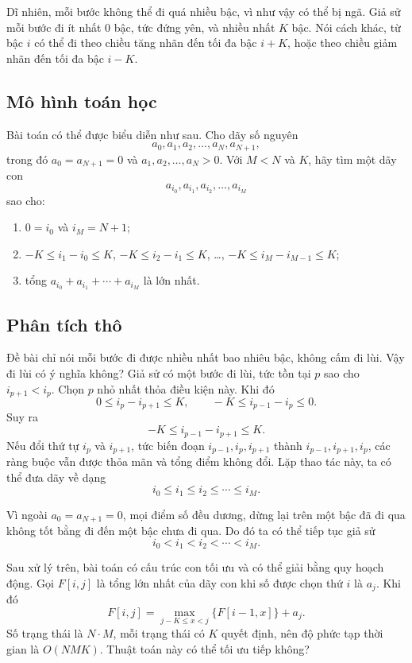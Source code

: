\documentclass[11pt]{article}
\begin{document}
Dĩ nhiên, mỗi bước không thể đi quá nhiều bậc, vì như vậy có thể bị ngã. Giả
sử mỗi bước đi ít nhất $0$ bậc, tức đứng yên, và nhiều nhất $K$ bậc. Nói cách
khác, từ bậc $i$ có thể đi theo chiều tăng nhãn đến tối đa bậc $i+K$, hoặc
theo chiều giảm nhãn đến tối đa bậc $i-K$.

\subsection{Mô hình toán học}

Bài toán có thể được biểu diễn như sau. Cho dãy số nguyên
\[
  a_0,a_1,a_2,\ldots,a_N,a_{N+1},
\]
trong đó $a_0=a_{N+1}=0$ và $a_1,a_2,\ldots,a_N>0$. Với $M<N$ và $K$, hãy tìm
một dãy con
\[
  a_{i_0},a_{i_1},a_{i_2},\ldots,a_{i_M}
\]
sao cho:
\begin{enumerate}
  \item $0=i_0$ và $i_M=N+1$;
  \item $-K\le i_1-i_0\le K$, $-K\le i_2-i_1\le K$, \ldots,
  $-K\le i_M-i_{M-1}\le K$;
  \item tổng $a_{i_0}+a_{i_1}+\cdots+a_{i_M}$ là lớn nhất.
\end{enumerate}

\subsection{Phân tích thô}

Đề bài chỉ nói mỗi bước đi được nhiều nhất bao nhiêu bậc, không cấm đi lùi.
Vậy đi lùi có ý nghĩa không? Giả sử có một bước đi lùi, tức tồn tại $p$ sao
cho $i_{p+1}<i_p$. Chọn $p$ nhỏ nhất thỏa điều kiện này. Khi đó
\[
  0\le i_p-i_{p+1}\le K,\qquad -K\le i_{p-1}-i_p\le 0.
\]
Suy ra
\[
  -K\le i_{p-1}-i_{p+1}\le K.
\]
Nếu đổi thứ tự $i_p$ và $i_{p+1}$, tức biến đoạn
$i_{p-1},i_p,i_{p+1}$ thành $i_{p-1},i_{p+1},i_p$, các ràng buộc vẫn được
thỏa mãn và tổng điểm không đổi. Lặp thao tác này, ta có thể đưa dãy về dạng
\[
  i_0\le i_1\le i_2\le \cdots\le i_M.
\]

Vì ngoài $a_0=a_{N+1}=0$, mọi điểm số đều dương, dừng lại trên một bậc đã đi
qua không tốt bằng đi đến một bậc chưa đi qua. Do đó ta có thể tiếp tục giả
sử
\[
  i_0<i_1<i_2<\cdots<i_M.
\]

Sau xử lý trên, bài toán có cấu trúc con tối ưu và có thể giải bằng quy hoạch
động. Gọi $F[i,j]$ là tổng lớn nhất của dãy con khi số được chọn thứ $i$ là
$a_j$. Khi đó
\[
  F[i,j]=\max_{j-K\le x<j}\{F[i-1,x]\}+a_j.
\]
Số trạng thái là $N\cdot M$, mỗi trạng thái có $K$ quyết định, nên độ phức tạp
thời gian là $O(NMK)$. Thuật toán này có thể tối ưu tiếp không?
\end{document}
